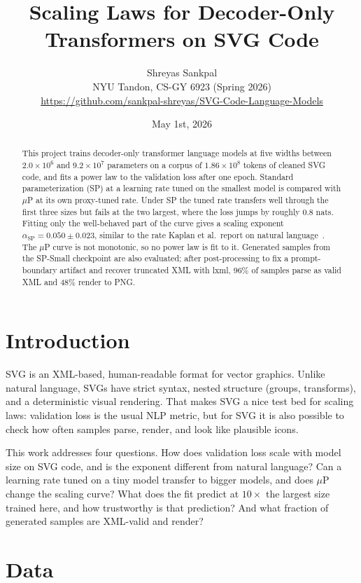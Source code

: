 \documentclass[11pt]{article}
\title{Scaling Laws for Decoder-Only Transformers on SVG Code}
\author{Shreyas Sankpal\\NYU Tandon, CS-GY 6923 (Spring 2026)\\[4pt]
\small\url{https://github.com/sankpal-shreyas/SVG-Code-Language-Models}}
\date{May 1st, 2026}
\begin{document}
\maketitle

\begin{abstract}
This project trains decoder-only transformer language models at five widths between $2.0\!\times\!10^6$ and $9.2\!\times\!10^7$ parameters on a corpus of $1.86\!\times\!10^8$ tokens of cleaned SVG code, and fits a power law to the validation loss after one epoch. Standard parameterization (SP) at a learning rate tuned on the smallest model is compared with $\mu$P at its own proxy-tuned rate. Under SP the tuned rate transfers well through the first three sizes but fails at the two largest, where the loss jumps by roughly $0.8$ nats. Fitting only the well-behaved part of the curve gives a scaling exponent $\alpha_{\text{SP}} = 0.050 \pm 0.023$, similar to the rate Kaplan et al.\ report on natural language~\citep{kaplan2020scaling}. The $\mu$P curve is not monotonic, so no power law is fit to it. Generated samples from the SP-Small checkpoint are also evaluated; after post-processing to fix a prompt-boundary artifact and recover truncated XML with lxml, 96\% of samples parse as valid XML and 48\% render to PNG.
\end{abstract}

\section{Introduction}
SVG is an XML-based, human-readable format for vector graphics. Unlike natural language, SVGs have strict syntax, nested structure (groups, transforms), and a deterministic visual rendering. That makes SVG a nice test bed for scaling laws: validation loss is the usual NLP metric, but for SVG it is also possible to check how often samples parse, render, and look like plausible icons.

This work addresses four questions. How does validation loss scale with model size on SVG code, and is the exponent different from natural language? Can a learning rate tuned on a tiny model transfer to bigger models, and does $\mu$P~\citep{yang2022tensor} change the scaling curve? What does the fit predict at $10\!\times$ the largest size trained here, and how trustworthy is that prediction? And what fraction of generated samples are XML-valid and render?

\section{Data}
\end{document}
